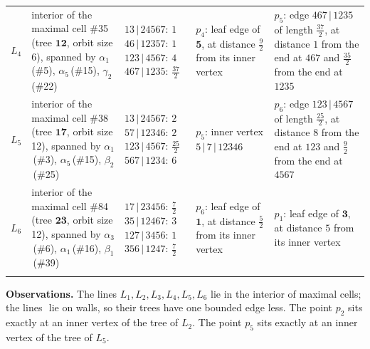 \documentclass[10pt]{article}
\begin{document}
{\begin{tabular}{@{}c p{4.1cm} p{3.7cm} p{6.9cm} p{6.9cm}@{}}
\(L_{4}\) & interior of the maximal cell \#35 (tree \(\mathbf{12}\), orbit size 6), spanned by \(\alpha_1\)\,(\#5), \(\alpha_5\)\,(\#15), \(\gamma_2\)\,(\#22) & \(13\,|\,24567\): \(1\)\newline \(46\,|\,12357\): \(1\)\newline \(123\,|\,4567\): \(4\)\newline \(467\,|\,1235\): \(\tfrac{37}{2}\) & \(p_{4}\): leaf edge of \(\mathbf{5}\), at distance \(\tfrac{9}{2}\) from its inner vertex & \(p_{5}\): edge \(467\,|\,1235\) of length \(\tfrac{37}{2}\), at distance \(1\) from the end at \(467\) and \(\tfrac{35}{2}\) from the end at \(1235\) \\\addlinespace
\(L_{5}\) & interior of the maximal cell \#38 (tree \(\mathbf{17}\), orbit size 12), spanned by \(\alpha_1\)\,(\#3), \(\alpha_5\)\,(\#15), \(\beta_2\)\,(\#25) & \(13\,|\,24567\): \(2\)\newline \(57\,|\,12346\): \(2\)\newline \(123\,|\,4567\): \(\tfrac{25}{2}\)\newline \(567\,|\,1234\): \(6\) & \(p_{5}\): inner vertex \(5\,|\,7\,|\,12346\) & \(p_{6}\): edge \(123\,|\,4567\) of length \(\tfrac{25}{2}\), at distance \(8\) from the end at \(123\) and \(\tfrac{9}{2}\) from the end at \(4567\) \\\addlinespace
\(L_{6}\) & interior of the maximal cell \#84 (tree \(\mathbf{23}\), orbit size 12), spanned by \(\alpha_3\)\,(\#6), \(\alpha_1\)\,(\#16), \(\beta_1\)\,(\#39) & \(17\,|\,23456\): \(\tfrac{7}{2}\)\newline \(35\,|\,12467\): \(3\)\newline \(127\,|\,3456\): \(1\)\newline \(356\,|\,1247\): \(\tfrac{7}{2}\) & \(p_{6}\): leaf edge of \(\mathbf{1}\), at distance \(\tfrac{5}{2}\) from its inner vertex & \(p_{1}\): leaf edge of \(\mathbf{3}\), at distance \(5\) from its inner vertex \\\addlinespace
\bottomrule\end{tabular}
}

\medskip
\textbf{Observations.}
The lines \(L_{1}, L_{2}, L_{3}, L_{4}, L_{5}, L_{6}\) lie in the interior of maximal cells; the lines \(\) lie on walls, so their trees have one bounded edge less.
The point \(p_{2}\) sits exactly at an inner vertex of the tree of \(L_{2}\).
The point \(p_{5}\) sits exactly at an inner vertex of the tree of \(L_{5}\).
\end{document}
